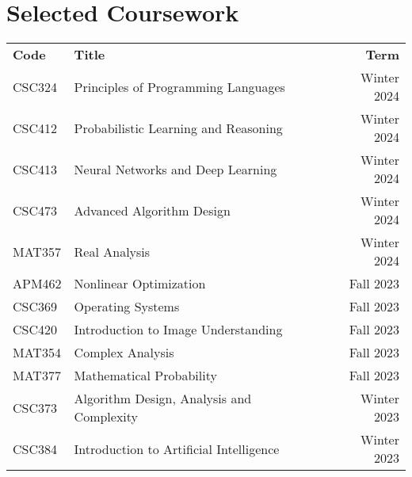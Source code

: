 \documentclass[letterpaper,11pt]{article}
\newcommand{\rom}[1]{\uppercase\expandafter{\romannumeral #1\relax}}
\begin{document}
    \section{Selected Coursework}
    \vspace{-0.3em}
    \begin{minipage}{\textwidth}
      \centering
      \renewcommand*{\thefootnote}{\fnsymbol{footnote}}
      \renewcommand*{\thempfootnote}{\fnsymbol{mpfootnote}}
      \renewcommand{\arraystretch}{1.2}
      \begin{tabularx}{0.98\textwidth}{ p{6.0em} X r }
        \textbf{Code} & \textbf{Title} & \textbf{Term} \\
        \noalign{\vspace{0.1em}}
        \hline\hline
        \noalign{\vspace{0.2em}}
        CSC324 & Principles of Programming Languages & Winter 2024 \\
        CSC412\footnotemark[2] & Probabilistic Learning and Reasoning & Winter 2024 \\
        CSC413\footnotemark[2] & Neural Networks and Deep Learning & Winter 2024 \\
        CSC473 & Advanced Algorithm Design & Winter 2024 \\
        MAT357 & Real Analysis \rom{1} & Winter 2024 \\


        APM462 & Nonlinear Optimization & Fall 2023 \\
        CSC369 & Operating Systems & Fall 2023 \\
        CSC420 & Introduction to Image Understanding & Fall 2023 \\
        MAT354 & Complex Analysis \rom{1} & Fall 2023 \\
        MAT377 & Mathematical Probability & Fall 2023 \\


        CSC373 & Algorithm Design, Analysis and Complexity & Winter 2023 \\
        CSC384 & Introduction to Artificial Intelligence & Winter 2023 \\


\end{tabularx}
\end{minipage}
\end{document}
